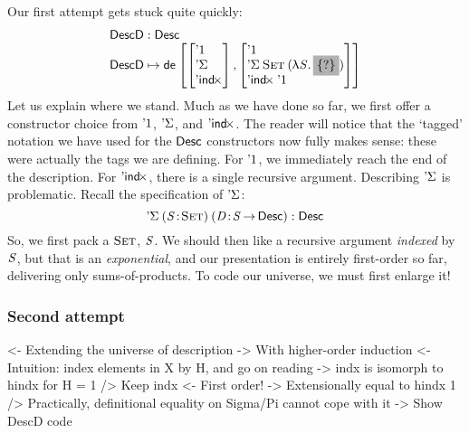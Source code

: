 Our first attempt gets stuck quite quickly:
%
\[\stk{
\DescD : \Desc \\
\DescD \mapsto
  \tada{\stkm{\DUnit\\ \SYMBDSigma\\ \SYMBDIndx}}
       {\stkm{ \DUnit                                \\
         \DSigma{\Set}{(\LAM{\V{S}} \SHED)}      \\
         \DIndx{\DUnit}    }                    } \\
}\]
%
Let us explain where we stand. Much as
we have done so far, we first offer a constructor choice from
$\DUnit$, $\SYMBDSigma$, and $\SYMBDIndx$. The reader will notice
that the `tagged' notation we have used for the $\Desc$ constructors now
fully makes sense: these were actually the tags we are defining.
For $\DUnit$, we immediately reach the end of the description. For
$\SYMBDIndx$, there is a single recursive argument. Describing
$\SYMBDSigma$ is problematic. Recall the specification of
$\SYMBDSigma$:
%
\[
\DSigma{(\Bhab{\V{S}}{\Set})}{(\Bhab{\V{D}}{\V{S} \To \Desc})} : \Desc\\
\]
%
So, we first pack a  $\Set$, $\V{S}$. We should then like
a recursive argument \emph{indexed} by $\V{S}$, but
that is an \emph{exponential}, and our presentation is entirely
first-order so far, delivering only sums-of-products. To code our
universe, we must first enlarge it!


\subsubsection{Second attempt}

\begin{wstructure}
<- Extending the universe of description
    -> With higher-order induction
    <- Intuition: index elements in X by H, and go on reading
        -> indx is isomorph to hindx for H = 1
    /> Keep indx
        <- First order!
        -> Extensionally equal to hindx 1
        /> Practically, definitional equality on Sigma/Pi cannot cope with it
    -> Show DescD code
\end{wstructure}

